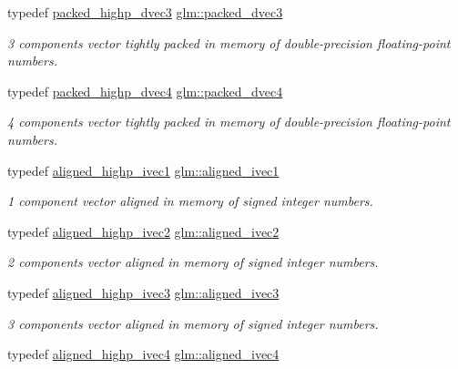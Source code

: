 \begin{DoxyCompactItemize}
typedef \hyperlink{group__gtc__type__aligned_ga46950596525c0d1983113ead5f676651}{packed\+\_\+highp\+\_\+dvec3} \hyperlink{group__gtc__type__aligned_ga57dabe800889e40fa81a5a7a81cc25f0}{glm\+::packed\+\_\+dvec3}
\begin{DoxyCompactList}\small\item\em 3 components vector tightly packed in memory of double-\/precision floating-\/point numbers. \end{DoxyCompactList}\item 
typedef \hyperlink{group__gtc__type__aligned_ga7eb6a2440202876a3a223a1931dd496a}{packed\+\_\+highp\+\_\+dvec4} \hyperlink{group__gtc__type__aligned_ga858e69be626bfb48d644d8d6fe81b1a2}{glm\+::packed\+\_\+dvec4}
\begin{DoxyCompactList}\small\item\em 4 components vector tightly packed in memory of double-\/precision floating-\/point numbers. \end{DoxyCompactList}\item 
typedef \hyperlink{group__gtc__type__aligned_ga90ebad7148156f223d4743091c9870d5}{aligned\+\_\+highp\+\_\+ivec1} \hyperlink{group__gtc__type__aligned_gafe9657c41fa58e912f99e92284d79fce}{glm\+::aligned\+\_\+ivec1}
\begin{DoxyCompactList}\small\item\em 1 component vector aligned in memory of signed integer numbers. \end{DoxyCompactList}\item 
typedef \hyperlink{group__gtc__type__aligned_ga34105808a80ef5dabd7807997dfef328}{aligned\+\_\+highp\+\_\+ivec2} \hyperlink{group__gtc__type__aligned_ga2a709e1d21f3aae3f8d6de910f5fdff4}{glm\+::aligned\+\_\+ivec2}
\begin{DoxyCompactList}\small\item\em 2 components vector aligned in memory of signed integer numbers. \end{DoxyCompactList}\item 
typedef \hyperlink{group__gtc__type__aligned_gaa469d8bf0cb9ae640c943d847ec48f95}{aligned\+\_\+highp\+\_\+ivec3} \hyperlink{group__gtc__type__aligned_gabbf85e492d39baef3a418c15c996ab65}{glm\+::aligned\+\_\+ivec3}
\begin{DoxyCompactList}\small\item\em 3 components vector aligned in memory of signed integer numbers. \end{DoxyCompactList}\item 
typedef \hyperlink{group__gtc__type__aligned_gabbac4883efc1760f4efb450753794f2d}{aligned\+\_\+highp\+\_\+ivec4} \hyperlink{group__gtc__type__aligned_gaa33169a30c7d22a8648f20b4534f635f}{glm\+::aligned\+\_\+ivec4}

\end{DoxyCompactItemize}
